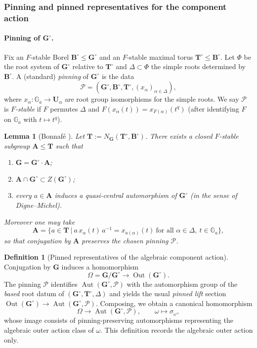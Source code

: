 \documentclass{amsart}
\theoremstyle{plain}
\numberwithin{equation}{section}
\newtheorem{lemma}[theorem]{Lemma}
\theoremstyle{definition}
\newtheorem{definition}[theorem]{Definition}
\newcommand{\Out}{\operatorname{Out}}
\newcommand{\Aut}{\operatorname{Aut}}
\begin{document}
\subsubsection{Pinning and pinned representatives for the component action}

\paragraph{Pinning of $\mathbf G^\circ$.}
Fix an $F$-stable Borel $\mathbf B^\circ\le \mathbf G^\circ$ and an $F$-stable maximal torus
$\mathbf T^\circ\le \mathbf B^\circ$.
Let $\Phi$ be the root system of $\mathbf G^\circ$ relative to $\mathbf T^\circ$ and
$\Delta\subset\Phi$ the simple roots determined by $\mathbf B^\circ$.
A (standard) \emph{pinning} of $\mathbf G^\circ$ is the data
\[
\mathcal P=(\mathbf G^\circ,\mathbf B^\circ,\mathbf T^\circ,(x_\alpha)_{\alpha\in\Delta}),
\]
where $x_\alpha:\mathbb G_a\to \mathbf U_\alpha$ are root group isomorphisms for the simple roots.
We say $\mathcal P$ is \emph{$F$-stable} if $F$ permutes $\Delta$ and
$F(x_\alpha(t))=x_{F(\alpha)}(t^q)$ (after identifying $F$ on $\mathbb G_a$ with $t\mapsto t^q$).

\begin{lemma}[Bonnafé {\cite[Lem.~6.2.1]{Bonnafe1999Produit}}]
Let $\mathbf T:=N_{\mathbf G}(\mathbf T^\circ,\mathbf B^\circ)$.
There exists a closed $F$-stable subgroup $\mathbf A\le \mathbf T$ such that
\begin{enumerate}[label=\textup{(\alph*)}]
\item $\mathbf G=\mathbf G^\circ\cdot \mathbf A$;
\item $\mathbf A\cap \mathbf G^\circ\subset Z(\mathbf G^\circ)$;
\item every $a\in \mathbf A$ induces a \emph{quasi-central} automorphism of $\mathbf G^\circ$
(in the sense of Digne--Michel).
\end{enumerate}
Moreover one may take
\[
\mathbf A=\bigl\{a\in \mathbf T \ \big|\
a\,x_\alpha(t)\,a^{-1}=x_{a(\alpha)}(t)\ \text{for all }\alpha\in\Delta,\ t\in\mathbb G_a\bigr\},
\]
so that conjugation by $\mathbf A$ preserves the chosen pinning $\mathcal P$.
\end{lemma}

\begin{definition}[Pinned representatives of the algebraic component action]\label{def:pinned-Omega-action}
Conjugation by $\mathbf G$ induces a homomorphism
\[
\Omega=\mathbf G/\mathbf G^\circ \longrightarrow \Out(\mathbf G^\circ).
\]
The pinning $\mathcal P$ identifies $\Aut(\mathbf G^\circ,\mathcal P)$ with the automorphism group of the
\emph{based} root datum of $(\mathbf G^\circ,\mathbf T^\circ,\Delta)$ and yields the usual
\emph{pinned lift} section $\Out(\mathbf G^\circ)\to \Aut(\mathbf G^\circ,\mathcal P)$.
Composing, we obtain a canonical homomorphism
\[
\Omega \longrightarrow \Aut(\mathbf G^\circ,\mathcal P),\qquad \omega\longmapsto \sigma_\omega,
\]
whose image consists of pinning-preserving automorphisms representing the algebraic outer action class of $\omega$.
This definition records the algebraic outer action only.
\end{definition}
\end{document}
